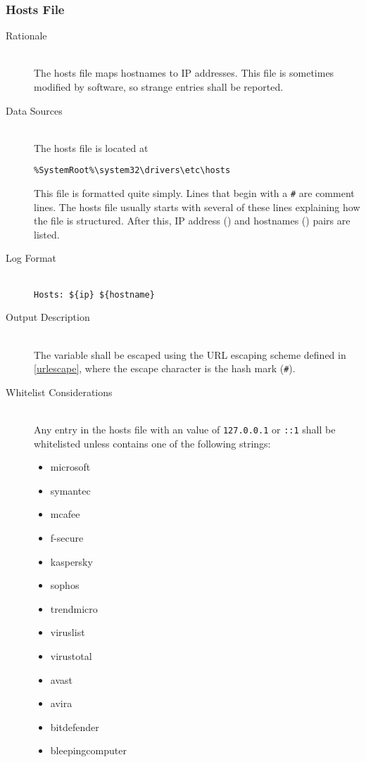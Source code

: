 \subsubsection{Hosts File}
\begin{description}
\item[Rationale] \hfill \\
The hosts file maps hostnames to IP addresses.  This file is sometimes modified
by software, so strange entries shall be reported.  
\item[Data Sources] \hfill \\
The hosts file is located at
\vspace{-\baselineskip}
\begin{verbatim}
%SystemRoot%\system32\drivers\etc\hosts
\end{verbatim}
This file is formatted quite simply.  Lines that begin with a \verb|#| are
comment lines.  The hosts file usually starts with several of these lines
explaining how the file is structured.  After this, IP address () and
hostnames () pairs are listed.
\item[Log Format] \hfill \\
\verb|Hosts: ${ip} ${hostname}|
\item[Output Description] \hfill \\
The variable  shall be escaped using the URL escaping scheme defined in
\ref{urlescape}, where the escape character is the hash mark (\verb|#|).
\item[Whitelist Considerations] \hfill \\
Any entry in the hosts file with an  value of \verb|127.0.0.1| or
\verb|::1| shall be whitelisted unless  contains one of the
following strings:
\begin{itemize}
  \item microsoft
  \item symantec
  \item mcafee
  \item f-secure
  \item kaspersky
  \item sophos
  \item trendmicro
  \item viruslist
  \item virustotal
  \item avast
  \item avira
  \item bitdefender
  \item bleepingcomputer

\end{itemize}
\end{description}
